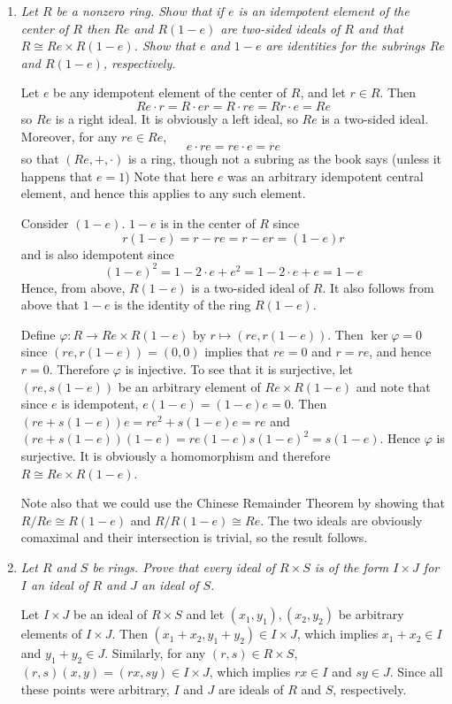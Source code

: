 \documentclass[letterpaper, 11pt]{article}
\newcommand{\iso}{\cong}
\begin{document}
\begin{enumerate}
\item \emph{Let $R$ be a nonzero ring.  Show that if $e$ is an idempotent element of the center of $R$ then $Re$ and $R(1-e)$ are two-sided ideals of $R$ and that $R \iso Re \times R(1-e)$.  Show that $e$ and $1-e$ are identities for the subrings $Re$ and $R(1-e)$, respectively.}

Let $e$ be any idempotent element of the center of $R$, and let $r \in R$.  Then $$Re\cdot r = R \cdot er = R \cdot re = Rr \cdot e = Re$$ so $Re$ is a right ideal.  It is obviously a left ideal, so $Re$ is a two-sided ideal.  Moreover, for any $re \in Re$, $$e \cdot re = re \cdot e = re$$ so that $(Re, +, \cdot)$ is a ring, though not a subring as the book says (unless it happens that $e = 1$)  Note that here $e$ was an arbitrary idempotent central element, and hence this applies to any such element.

Consider $(1-e)$.  $1-e$ is in the center of $R$ since $$r(1-e) = r-re = r-er = (1-e)r$$ and is also idempotent since $$(1-e)^2 = 1 - 2\cdot e + e^2 = 1 - 2\cdot e + e= 1-e$$  Hence, from above, $R(1-e)$ is a two-sided ideal of $R$.  It also follows from above that $1-e$ is the identity of the ring $R(1-e)$.

Define $\varphi: R \rightarrow Re \times R(1-e)$ by $r \mapsto (re, r(1-e))$.  Then $\ker \varphi = 0$ since $(re, r(1-e)) = (0,0)$ implies that $re = 0$ and $r = re$, and hence $r = 0$.  Therefore $\varphi$ is injective.  To see that it is surjective, let $(re, s(1-e))$ be an arbitrary element of $Re \times R(1-e)$ and note that since $e$ is idempotent, $e(1-e) = (1-e)e = 0$.  Then $(re + s(1-e))e = re^2 + s(1-e)e = re$ and $(re + s(1-e))(1-e) = re(1-e) s(1-e)^2 = s(1-e)$.  Hence $\varphi$ is surjective.  It is obviously a homomorphism and therefore $R \iso Re \times R(1-e)$.

Note also that we could use the Chinese Remainder Theorem by showing that $R/Re \iso R(1-e)$ and $R/R(1-e) \iso Re$.  The two ideals are obviously comaximal and their intersection is trivial, so the result follows.

\item \emph{Let $R$ and $S$ be rings.  Prove that every ideal of $R \times S$ is of the form $I \times J$ for $I$ an ideal of $R$ and $J$ an ideal of $S$.}

Let $I \times J$ be an ideal of $R \times S$ and let $(x_1, y_1), (x_2, y_2)$ be arbitrary elements of $I \times J$.  Then $(x_1+x_2, y_1+y_2) \in I \times J$, which implies $x_1 + x_2 \in I$ and $y_1 + y_2 \in J$.  Similarly, for any $(r,s) \in R \times S$, $(r,s)(x,y) = (rx, sy) \in I \times J$, which implies $rx \in I$ and $sy \in J$.  Since all these points were arbitrary, $I$ and $J$ are ideals of $R$ and $S$, respectively.


\end{enumerate}
\end{document}
